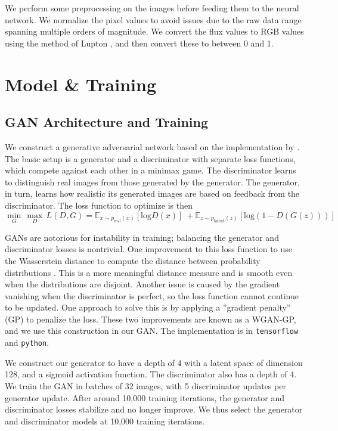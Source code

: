 \documentclass{article}
\DeclareMathOperator*{\maxi}{max}
\DeclareMathOperator*{\mini}{min}
\begin{document}
We perform some preprocessing on the images before feeding them to the neural network.
We normalize the pixel values to avoid issues due to the raw data range spanning multiple orders of magnitude.
We convert the flux values to RGB values using the method of Lupton \citep{Lupton2003}, and then convert these to between 0 and 1.


\section{Model \& Training}
\label{headings}

\subsection{GAN Architecture and Training}

We construct a generative adversarial network based on the implementation by \cite{Gulrajani2017}.
The basic setup is a generator and a discriminator with separate loss functions, which compete against each other in a minimax game.
The discriminator learns to distinguish real images from those generated by the generator.
The generator, in turn, learns how realistic its generated images are based on feedback from the discriminator.
The loss function to optimize is then
\begin{equation}
\mini_G \, \maxi_D \, L(D,G) = \mathbb{E}_{x\sim p_{\mathrm{real}}(x)}[\mathrm{log} D(x)] \: + \mathbb{E}_{z\sim p_{\mathrm{latent}}(z)}[\mathrm{log}(1 - D(G(z)))] 
\end{equation}

GANs are notorious for instability in training; balancing the generator and discriminator losses is nontrivial.
One improvement to this loss function to use the Wasserstein distance to compute the distance between probability distributions \citep{Arjovsky2017}.
This is a more meaningful distance measure and is smooth even when the distributions are disjoint. 
Another issue is caused by the gradient vanishing when the discriminator is perfect, so the loss function cannot continue to be updated.
One approach to solve this is by applying a ''gradient penalty'' (GP) to penalize the loss.
These two improvements are known as a WGAN-GP, and we use this construction in our GAN.
The implementation is in \texttt{tensorflow} and \texttt{python}.

We construct our generator to have a depth of 4 with a latent space of dimension 128, and a sigmoid activation function.
The discriminator also has a depth of 4.
We train the GAN in batches of 32 images, with 5 discriminator updates per generator update.
After around 10,000 training iterations, the generator and discriminator losses stabilize and no longer improve.
We thus select the generator and discriminator models at 10,000 training iterations. 
\end{document}

